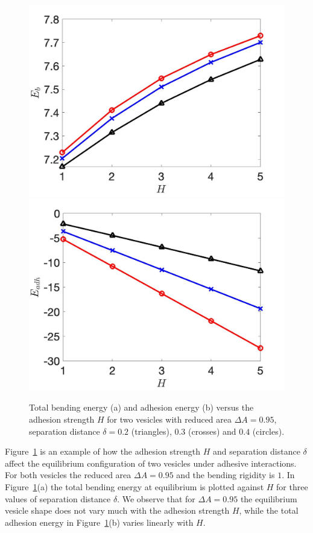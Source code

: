 \documentclass[prf,superscriptaddress,showpacs]{revtex4-1}
\begin{document}
\begin{figure}
\includegraphics[keepaspectratio=true,scale=0.18]{figs/Dec18_Eb_vs_sigma_rA0p9502.jpeg}
\includegraphics[keepaspectratio=true,scale=0.18]{figs/Dec18_Eadh_vs_sigma_rA0p9502.jpeg}
\caption{Total bending energy (a) and adhesion energy (b) versus the
  adhesion strength $H$ 
for two vesicles with reduced area $\Delta A=0.95$, separation distance $\delta = 0.2$ (triangles), $0.3$ (crosses)
and $0.4$ (circles). }
\label{fig:Dec18_equilibrium} 
\end{figure}
%
Figure~\ref{fig:Dec18_equilibrium} is an example of how the adhesion
strength $H$ and separation distance $\delta$ affect the equilibrium
configuration of two vesicles under adhesive interactions.  For both
vesicles the reduced area $\Delta A=0.95$ and the bending rigidity is
$1$.  In Figure~\ref{fig:Dec18_equilibrium}(a) the total bending energy
at equilibrium is plotted against $H$ for three values of separation
distance $\delta$.  We observe that for $\Delta A=0.95$ the equilibrium
vesicle shape does not vary much with the adhesion strength $H$, while
the total adhesion energy in Figure~\ref{fig:Dec18_equilibrium}(b)
varies linearly with $H$.
\end{document}
